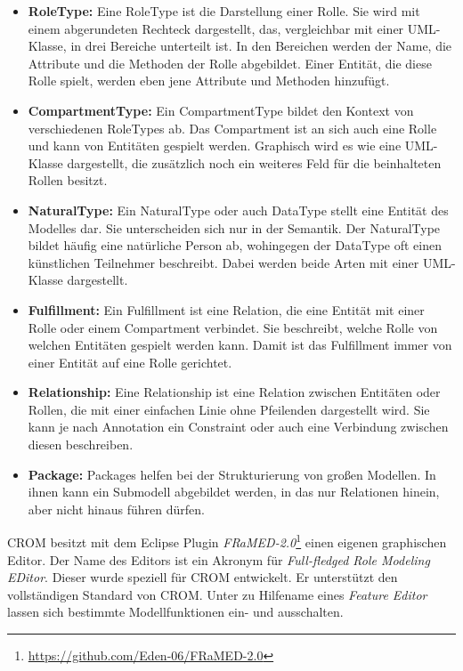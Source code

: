 \begin{itemize}
    \item \textbf{RoleType:}
    Eine RoleType ist die Darstellung einer Rolle.
    Sie wird mit einem abgerundeten Rechteck dargestellt, das, vergleichbar mit einer UML-Klasse, in drei Bereiche unterteilt ist.
    In den Bereichen werden der Name, die Attribute und die Methoden der Rolle abgebildet.
    Einer Entität, die diese Rolle spielt, werden eben jene Attribute und Methoden hinzufügt.
    \item \textbf{CompartmentType:}
    Ein CompartmentType bildet den Kontext von verschiedenen RoleTypes ab.
    Das Compartment ist an sich auch eine Rolle und kann von Entitäten gespielt werden.
    Graphisch wird es wie eine UML-Klasse dargestellt, die zusätzlich noch ein weiteres Feld für die beinhalteten Rollen besitzt.
    \item \textbf{NaturalType:}
    Ein NaturalType oder auch DataType stellt eine Entität des Modelles dar.
    Sie unterscheiden sich nur in der Semantik.
    Der NaturalType bildet häufig eine natürliche Person ab, wohingegen der DataType oft einen künstlichen Teilnehmer beschreibt.
    Dabei werden beide Arten mit einer UML-Klasse dargestellt. 
    \item \textbf{Fulfillment:}
    Ein Fulfillment ist eine Relation, die eine Entität mit einer Rolle oder einem Compartment verbindet.
    Sie beschreibt, welche Rolle von welchen Entitäten gespielt werden kann.
    Damit ist das Fulfillment immer von einer Entität auf eine Rolle gerichtet.
    \item \textbf{Relationship:}
    Eine Relationship ist eine Relation zwischen Entitäten oder Rollen, die mit einer einfachen Linie ohne Pfeilenden dargestellt wird.
    Sie kann je nach Annotation ein Constraint oder auch eine Verbindung zwischen diesen beschreiben.
    \item \textbf{Package:}
    Packages helfen bei der Strukturierung von großen Modellen.
    In ihnen kann ein Submodell abgebildet werden, in das nur Relationen hinein, aber nicht hinaus führen dürfen.
\end{itemize}

CROM besitzt mit dem Eclipse Plugin \emph{FRaMED-2.0}\footnote{\url{https://github.com/Eden-06/FRaMED-2.0}} einen eigenen graphischen Editor.
Der Name des Editors ist ein Akronym für \emph{Full-fledged Role Modeling EDitor}. 
Dieser wurde speziell für CROM entwickelt.
Er unterstützt den vollständigen Standard von CROM.
Unter zu Hilfename eines \emph{Feature Editor} lassen sich bestimmte Modellfunktionen ein- und ausschalten.

